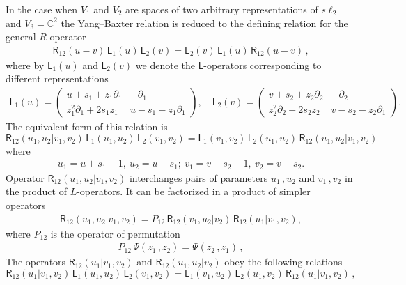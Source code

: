 \documentclass[11pt]{article}
\numberwithin{equation}{section}
\theoremstyle{plain}
\theoremstyle{definition}
\newcommand{\R}{\mathsf{R}}
\begin{document}
In the case when $V_1$ and $V_2$ are spaces of two 
arbitrary representations of $s\ell_2$ and $V_3 = \mathbb{C}^2$ 
the Yang--Baxter relation is reduced to the defining relation for 
the general $R$-operator
\begin{align}\label{RLL-0}
	\R_{12}(u-v)\,\mathsf{L}_1(u)\,\mathsf{L}_2(v) = 
	\mathsf{L}_2(v)\,\mathsf{L}_1(u)\,\R_{12}(u-v) \,,
\end{align}
where by $\mathsf{L}_1(u)$ and $\mathsf{L}_2(v)$ we denote the $\mathsf{L}$-operators corresponding to different representations 
\begin{align*}
	\mathsf{L}_1(u) = 
	\left(\begin{array}{cc} u+s_1+z_1 \partial_1 & -\partial_1\\
		z_1^2 \partial_1 + 2s_1 z_1 & u-s_1 -z_1
		\partial_1
	\end{array}\right) , \quad
	\mathsf{L}_2(v) = 
	\left(\begin{array}{cc} v+s_2+z_2 \partial_2 & -\partial_2\\
		z_2^2 \partial_2 + 2s_2 z_2 & v-s_2 -z_2
		\partial_1
	\end{array}\right) .
\end{align*}
The equivalent form of this relation is 
\begin{equation}\R_{12}(u_{1},u_2|v_{1},v_2)\,
	\mathsf{L}_{1}(u_1,u_2)\,\mathsf{L}_{2}(v_1,v_2)=
	\mathsf{L}_{1}(v_1,v_2)\,\mathsf{L}_{2}(u_1,u_2)\,
	\R_{12}(u_{1},u_2|v_{1},v_2)
\end{equation}
where 
\begin{align}\label{param} 
	u_1 = u+s_1-1 ,\ u_2 = u-s_1 ;\ v_1
	= v+s_2-1 ,\ v_2 = v-s_2 . 
\end{align}
Operator $\R_{12}(u_{1},u_2|v_{1},v_2)$ interchanges pairs
of parameters $u_1\,,u_2$ and $v_1\,,v_2$ in the product 
of $L$-operators. It can be factorized in a product of  
simpler operators~\cite{D,DM}
\begin{align}
	\R_{12}(u_{1},u_2|v_{1},v_2) =
	P_{12}\,\R_{12}(v_1,u_2|v_2)\,\R_{12}(u_1|v_1,v_{2}),
	\label{Rfact}
\end{align}
where $P_{12}$ is the operator of permutation 
\begin{align*}
	P_{12}\,\Psi(z_1\,,z_2) = \Psi(z_2\,,z_1) \,,
\end{align*}
The operators $\R_{12}(u_1|v_1,v_2)$ and
$\R_{12}(u_1,u_2|v_2)$ obey the following relations
\begin{equation}
	\R_{12}(u_1|v_1,v_2)\,
	\mathsf{L}_{1}(u_1,u_2)\,\mathsf{L}_{2}(v_1,v_2)=
	\mathsf{L}_{1}(v_1,u_2)\,\mathsf{L}_{2}(u_1,v_2)\,
	\R_{12}(u_1|v_1,v_2)\,, \label{R1}
\end{equation}
\end{document}
